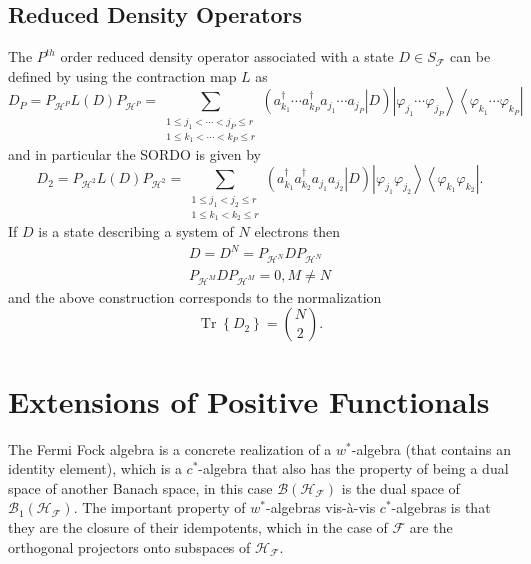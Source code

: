 \documentclass[aps,preprint]{revtex4}%
\begin{document}
\subsection{Reduced Density Operators \label{Reduced Density Operators}}

The $P^{th}$ order reduced density operator associated with a state $D\in
S_{\mathcal{F}}$ can be defined by using the contraction map $L$ as
\begin{equation}
D_{P}=P_{\mathcal{H}^{P}}L\left(  D\right)  P_{\mathcal{H}^{P}}=\sum
_{\substack{1\leq j_{1}<\cdots<j_{P}\leq r\\1\leq k_{1}<\cdots<k_{P}\leq
r}}\left(  \left.  a_{k_{1}}^{\dagger}\cdots a_{k_{P}}^{\dagger}a_{j_{1}%
}\cdots a_{j_{P}}\right\vert D\right)  \left\vert \varphi_{j_{1}}\cdots
\varphi_{j_{P}}\right\rangle \left\langle \varphi_{k_{1}}\cdots\varphi_{k_{P}%
}\right\vert \label{PORDO}%
\end{equation}
and in particular the SORDO is given by
\begin{equation}
D_{2}=P_{\mathcal{H}^{2}}L\left(  D\right)  P_{\mathcal{H}^{2}}=\sum
_{\substack{1\leq j_{1}<j_{2}\leq r\\1\leq k_{1}<k_{2}\leq r}}\left(  \left.
a_{k_{1}}^{\dagger}a_{k_{2}}^{\dagger}a_{j_{1}}a_{j_{2}}\right\vert D\right)
\left\vert \varphi_{j_{1}}\varphi_{j_{2}}\right\rangle \left\langle
\varphi_{k_{1}}\varphi_{k_{2}}\right\vert .
\end{equation}
If $D$ is a state describing a system of $N$ electrons then
\begin{gather}
D=D^{N}=P_{\mathcal{H}^{N}}DP_{\mathcal{H}^{N}}\nonumber\\
P_{\mathcal{H}^{M}}DP_{\mathcal{H}^{M}}=0,M\neq N
\end{gather}
and the above construction corresponds to the normalization
\begin{equation}
\operatorname*{Tr}\left\{  D_{2}\right\}  =\binom{N}{2}.
\end{equation}


\section{Extensions of Positive Functionals \label{Extensions}}

The Fermi Fock algebra is a concrete realization of a $w^{\ast}$-algebra
\cite{Encyclo} (that contains an identity element), which is a $c^{\ast}%
$-algebra that also has the property of being a dual space of another Banach
space, in this case $\mathcal{B}\left(  \mathcal{H}_{\mathcal{F}}\right)  $ is
the dual space of $\mathcal{B}_{1}\left(  \mathcal{H}_{\mathcal{F}}\right)  $.
The important property of $w^{\ast}$-algebras vis-\`{a}-vis $c^{\ast}%
$-algebras is that they are the closure of their idempotents, which in the
case of $\mathcal{F}$ are the orthogonal projectors onto subspaces of
$\mathcal{H}_{\mathcal{F}}.$
\end{document}
